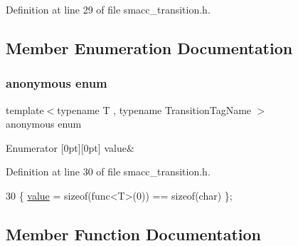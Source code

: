 Definition at line 29 of file smacc\+\_\+transition.\+h.



\subsection{Member Enumeration Documentation}
\mbox{\label{classsmacc_1_1HasSpecificNamedOnExit_aff1a587a8d216597d2dd5b208affc8d0}} 
\subsubsection{\texorpdfstring{anonymous enum}{anonymous enum}}
{\footnotesize\ttfamily template$<$typename T , typename Transition\+Tag\+Name $>$ \\
anonymous enum}

\begin{DoxyEnumFields}{Enumerator}
[0pt][0pt]{}\mbox{\label{classsmacc_1_1HasSpecificNamedOnExit_aff1a587a8d216597d2dd5b208affc8d0a37b1f8de55f442fbc24c211bacfcccf7}} 
value&\\
\hline

\end{DoxyEnumFields}


Definition at line 30 of file smacc\+\_\+transition.\+h.


\begin{DoxyCode}
30 \{ \hyperlink{classsmacc_1_1HasSpecificNamedOnExit_aff1a587a8d216597d2dd5b208affc8d0a37b1f8de55f442fbc24c211bacfcccf7}{value} = \textcolor{keyword}{sizeof}(func<T>(0)) == \textcolor{keyword}{sizeof}(char) \};
\end{DoxyCode}


\subsection{Member Function Documentation}
\mbox{\label{classsmacc_1_1HasSpecificNamedOnExit_aeaaa52aa3aeb9d4c912aa953e020ab50}} 
